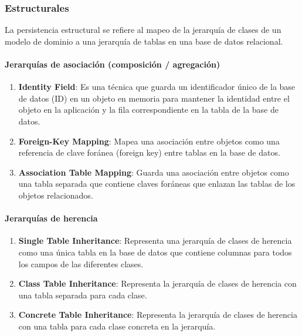 \documentclass{article}
\begin{document}
		
		\subsubsection{Estructurales}
		La persistencia estructural se refiere al mapeo de la jerarquía de clases de un modelo de dominio a una jerarquía de tablas en una base de datos relacional.
		\paragraph{Jerarquías de asociación (composición / agregación)}
		
			\begin{enumerate}
			\item {\textbf{Identity Field}}: Es una técnica que guarda un identificador único de la base de datos (ID) en un objeto en memoria para mantener la identidad entre el objeto en la aplicación y la fila correspondiente en la tabla de la base de datos.
			
			
			\item {\textbf{Foreign-Key Mapping}}: Mapea una asociación entre objetos como una referencia de clave foránea (foreign key) entre tablas en la base de datos.
			
			\item {\textbf{Association Table Mapping}}: Guarda una asociación entre objetos como una tabla separada que contiene claves foráneas que enlazan las tablas de los objetos relacionados.
			
		\end{enumerate}

		\paragraph{Jerarquías de herencia}
		
			\begin{enumerate}
				\item {\textbf{Single Table Inheritance}}: Representa una jerarquía de clases de herencia como una única tabla en la base de datos que contiene columnas para todos los campos de las diferentes clases.				
				
				\item {\textbf{Class Table Inheritance}}: Representa la jerarquía de clases de herencia con una tabla separada para cada clase.				
				
				
				\item {\textbf{Concrete Table Inheritance}}: Representa la jerarquía de clases de herencia con una tabla para cada clase concreta en la jerarquía.
				
			\end{enumerate}
		
\end{document}
